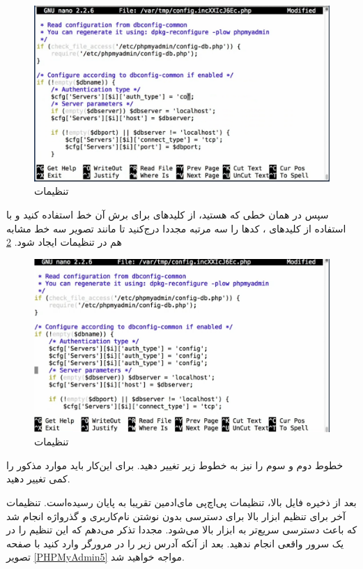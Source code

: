 \begin{figure}
    \includegraphics[width=.9\textwidth ,height=.55\textwidth]{Pic/PHPADMIN4}
    \caption{ تنظیمات 
    }
    \label{PHPMyAdmin4}
\end{figure}
سپس در همان خطی که هستید، از کلید‌های 
 برای برش آن خط استفاده کنید و با استفاده از کلیدهای 
 ، کدها را سه مرتبه مجددا درج‌کنید تا مانند تصویر سه خط مشابه هم در تنظیمات ایجاد شود.
 \ref{PHP-MyAdmin2}
\begin{figure}
    \includegraphics[width=.9\textwidth ,height=.55\textwidth]{Pic/PHPADMIN5}
    \caption{ تنظیمات 
    }
    \label{PHP-MyAdmin2}
\end{figure}
خطوط دوم و سوم را نیز به خطوط زیر تغییر دهید. برای این‌کار باید موارد مذکور را کمی تغییر دهید.
\begin{latin}  
    
\end{latin}
بعد از ذخیره فایل بالا، تنظیمات پی‌اچ‌پی مای‌ادمین تقریبا به پایان رسیده‌است. تنظیمات آخر برای تنظیم ابزار بالا برای دسترسی بدون نوشتن نام‌کاربری و گذرواژه انجام شد که باعث دسترسی سریع‌تر به ابزار بالا می‌شود. مجددا تذکر می‌دهم که این تنظیم را در یک سرور واقعی انجام ندهید. بعد از آنکه آدرس زیر را در مرورگر وارد کنید با صفحه تصویر 
\ref{PHPMyAdmin5}
 مواجه خواهید شد.
 
